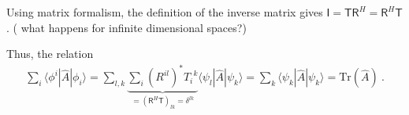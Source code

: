 \documentclass[letterpaper,10pt,english]{jupyterBook}
\begin{document}
\sphinxAtStartPar
Using matrix formalism, the definition of the inverse matrix gives \(\mathsf{I} = \mathsf{T} \mathsf{R}^H = \mathsf{R}^H \mathsf{T}\). ( what happens for infinite dimensional spaces?)

\sphinxAtStartPar
Thus, the relation
\begin{equation*}
\begin{split}
  \sum_i \langle \phi^i | \hat{A} | \phi_i \rangle = \sum_{l,k}  \underbrace{\sum_i  \left( R^{il} \right)^* T_{i}^{\ \ k}}_{= \left( \mathsf{R}^H \mathsf{T} \right)_{lk} =\delta^{lk}} \langle \psi_l | \hat{A} | \psi_k \rangle = \sum_k \langle \psi_k | \hat{A} | \psi_k \rangle = \text{Tr}\left( \hat{A} \right) \ .
\end{split}
\end{equation*}
\sphinxAtStartPar
{} 
\end{document}
